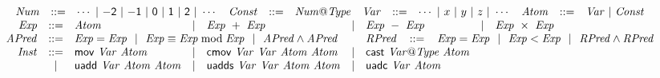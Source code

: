 
\begin{figure*}
  \centering
  \begin{math}
    \begin{array}{rclclclcl}
      \multicolumn{9}{c}{
      \begin{array}{rclrclrclrcl}
      \mathit{Num} & ::= & \cdots \ |\ \mathsf{-2} \ |\ \mathsf{-1}
                              \ |\ \mathsf{0} \ |\ \mathsf{1} \ |\
                           \mathsf{2} \ |\  \cdots
      &
      \mathit{Const} & ::= & \mathit{Num}\mathsf{@}\mathit{Type}
      &
      \mathit{Var} & ::= & \cdots\ |\ x \ |\ y \ |\ z \ |\ \cdots
      &
      \mathit{Atom} & ::= & \mathit{Var} \ |\ \mathit{Const}
      \end{array}
      }
      \\
      \mathit{Exp} & ::= &
            \mathit{Atom}
      & | & \mathit{Exp}\ +\ \mathit{Exp}
      & | & \mathit{Exp}\ -\ \mathit{Exp}
      & | & \mathit{Exp}\ \times\ \mathit{Exp}
      \\
      \mathit{APred} & ::= &
      \multicolumn{3}{l}{
        \mathit{Exp} = \mathit{Exp}
        \hspace{1.6ex} | \hspace{1.6ex}
        \mathit{Exp} \equiv \mathit{Exp} \bmod \mathit{Exp}
        \hspace{1.6ex} | \hspace{1.6ex}
        \mathit{APred} \wedge \mathit{APred}
      }
      & &
      \multicolumn{3}{l}{
      \mathit{RPred}\hspace{2ex} ::=\hspace{2ex}
            \mathit{Exp} = \mathit{Exp}
            \hspace{1.6ex} | \hspace{1.6ex}
            \mathit{Exp} < \mathit{Exp}
            \hspace{1.6ex} | \hspace{1.6ex}
            \mathit{RPred} \wedge \mathit{RPred}
      }
      \\
      \mathit{Inst} & ::= &
            \clMov\ \mathit{Var}\ \mathit{Atom}
      & | & \clCmov\ \mathit{Var}\ \mathit{Var}\
            \mathit{Atom}\ \mathit{Atom}
      & | & \clVPCast\ \mathit{Var}\mathsf{@}\mathit{Type}\ \mathit{Atom}\\
      & | & \clUAdd\ \mathit{Var}\ \mathit{Atom}\ \mathit{Atom}
      & | & \clUAdds\ \mathit{Var}\ \mathit{Var}\
            \mathit{Atom}\ \mathit{Atom}
      & | & \clUAdc\ \mathit{Var}\ \mathit{Atom}\

\end{array}
\end{math}
\end{figure*}
